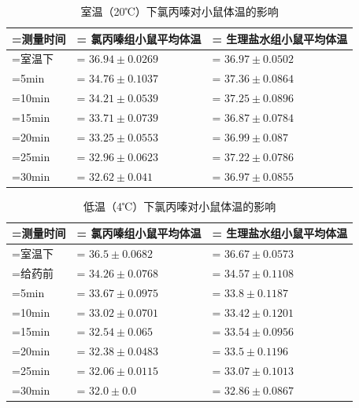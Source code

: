 \documentclass[UTF8]{ctexart}
\begin{document}
\begin{table}[H]
    \centering
    \begin{threeparttable}[b]
        \caption{室温（20℃）下氯丙嗪对小鼠体温的影响}
        \quad

        \begin{tabularx}{\textwidth}{
            >{\columnC\hsize=1\hsize\linewidth=\hsize}X
            >{\columnC\hsize=1\hsize\linewidth=\hsize}X
            >{\columnC\hsize=1\hsize\linewidth=\hsize}X
        }
        \toprule[1.5pt]
        测量时间 & 氯丙嗪组小鼠平均体温 & 生理盐水组小鼠平均体温 \\
        \midrule
        室温下 & $36.94\pm0.0269$ & $36.97\pm0.0502$ \\
        5min & $34.76\pm0.1037$ & $37.36\pm0.0864$ \\
        10min & $34.21\pm0.0539$ & $37.25\pm0.0896$ \\
        15min & $33.71\pm0.0739$ & $36.87\pm0.0784$ \\
        20min & $33.25\pm0.0553$ & $36.99\pm0.087$ \\
        25min & $32.96\pm0.0623$ & $37.22\pm0.0786$ \\
        30min & $32.62\pm0.041$ & $36.97\pm0.0855$ \\
        \bottomrule[1.5pt]
        \end{tabularx}
    \end{threeparttable}
\end{table}

\begin{table}[H]
    \centering
    \begin{threeparttable}[b]
        \caption{低温（4℃）下氯丙嗪对小鼠体温的影响}
        \quad

        \begin{tabularx}{\textwidth}{
            >{\columnC\hsize=1\hsize\linewidth=\hsize}X
            >{\columnC\hsize=1\hsize\linewidth=\hsize}X
            >{\columnC\hsize=1\hsize\linewidth=\hsize}X
        }
        \toprule[1.5pt]
        测量时间 & 氯丙嗪组小鼠平均体温 & 生理盐水组小鼠平均体温 \\
        \midrule
        室温下 & $36.5\pm0.0682$ & $36.67\pm0.0573$ \\
        给药前 & $34.26\pm0.0768$ & $34.57\pm0.1108$ \\
        5min & $33.67\pm0.0975$ & $33.8\pm0.1187$ \\
        10min & $33.02\pm0.0701$ & $33.42\pm0.1201$ \\
        15min & $32.54\pm0.065$ & $33.54\pm0.0956$ \\
        20min & $32.38\pm0.0483$ & $33.5\pm0.1196$ \\
        25min & $32.06\pm0.0115$ & $33.07\pm0.1013$ \\
        30min & $32.0\pm0.0$ & $32.86\pm0.0867$ \\
        \bottomrule[1.5pt]
        \end{tabularx}
    \end{threeparttable}
\end{table}
\end{document}
